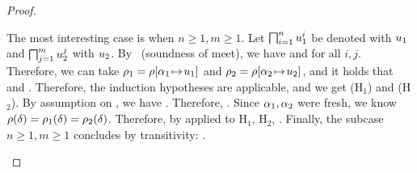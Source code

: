 \begin{proof}
\begin{itemize}
            The most interesting case is when $n \geq 1, m \geq 1$.
            Let $\textstyle\bigsqcap_{i=1}^n u_1^i$ be denoted with $u_1$
            and $\textstyle\bigsqcap_{j=1}^m u_2^j$ with $u_2$.
            By~ (soundness of meet), we have
             and 
            for all $i, j$. Therefore, we can take 
            $\rho_1 = \rho[\alpha_1\!\mapsto\!u_1]$ and
            $\rho_2 = \rho[\alpha_2\!\mapsto\!u_2]$,
            and it holds that  and
            .
            Therefore, the induction hypotheses are applicable, and we get
             (H$_1$) and
             (H$_2$).
            By assumption on \substvars, we have
            .
            Therefore, \subtydflt{\plug{\substvars(\dctx)}{\substvars(\va)}}
                {}.
            Since $\alpha_1, \alpha_2$ were fresh, we know
            $\rho(\delta) = \rho_1(\delta) = \rho_2(\delta)$.
            Therefore, by  applied to H$_1$, H$_2$,
                {}.
            Finally, the subcase $n \geq 1, m \geq 1$ concludes by transitivity:
            .
    \end{itemize}
\end{proof}


